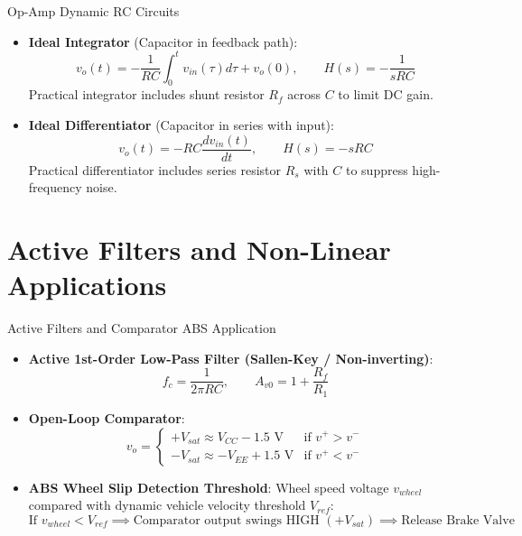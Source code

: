 \begin{formulabox}{Op-Amp Dynamic RC Circuits}
\begin{itemize}[leftmargin=1.5em]
    \item \textbf{Ideal Integrator} (Capacitor in feedback path):
    \[ v_o(t) = -\frac{1}{R C}\int_0^t v_{in}(\tau) d\tau + v_o(0), \qquad H(s) = -\frac{1}{s R C} \]
    Practical integrator includes shunt resistor $R_f$ across $C$ to limit DC gain.
    \item \textbf{Ideal Differentiator} (Capacitor in series with input):
    \[ v_o(t) = -R C \frac{dv_{in}(t)}{dt}, \qquad H(s) = -s R C \]
    Practical differentiator includes series resistor $R_s$ with $C$ to suppress high-frequency noise.
\end{itemize}
\end{formulabox}

\section{Active Filters and Non-Linear Applications}

\begin{formulabox}{Active Filters and Comparator ABS Application}
\begin{itemize}[leftmargin=1.5em]
    \item \textbf{Active 1st-Order Low-Pass Filter (Sallen-Key / Non-inverting)}:
    \[ f_c = \frac{1}{2\pi R C}, \qquad A_{v0} = 1 + \frac{R_f}{R_1} \]
    \item \textbf{Open-Loop Comparator}:
    \[ v_o = \begin{cases} +V_{sat} \approx V_{CC} - 1.5\text{ V} & \text{if } v^+ > v^- \\ -V_{sat} \approx -V_{EE} + 1.5\text{ V} & \text{if } v^+ < v^- \end{cases} \]
    \item \textbf{ABS Wheel Slip Detection Threshold}:
    Wheel speed voltage $v_{wheel}$ compared with dynamic vehicle velocity threshold $V_{ref}$:
    \[ \text{If } v_{wheel} < V_{ref} \implies \text{Comparator output swings HIGH } (+V_{sat}) \implies \text{Release Brake Valve} \]
\end{itemize}
\end{formulabox}
